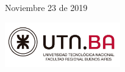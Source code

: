 \begin{titlepage}
	
	\vfill\vfill\vfill %
	{\large Noviembre 23 de 2019} %

	\vfill
	\includegraphics[width=50mm]{./imagenes/Logo_UTN.png}\\[1cm] %
\end{titlepage}

% 
